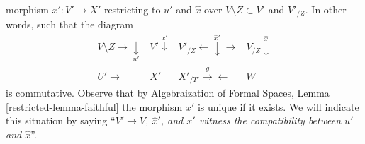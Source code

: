 morphism $x' : V' \to X'$ restricting to $u'$ and $\hat x$
over $V \setminus Z \subset V'$ and $V'_{/Z}$.
In other words, such that the diagram
$$
\begin{array}{cccc}V \setminus Z \longrightarrow\underset{u'}{\downarrow} & V' \overset{x'}{\downarrow} & V'_{/Z} \longleftarrow\overset{\hat x'}{\downarrow}\longrightarrow & V_{/Z} \overset{\hat x}{\downarrow} \\ U' \longrightarrow & X' & X'_{/T'} \overset{g}{\longrightarrow}\longleftarrow & W\end{array}
$$
is commutative. Observe that by Algebraization of Formal Spaces,
Lemma \ref{restricted-lemma-faithful} the morphism $x'$ is unique
if it exists. We will indicate this situation by saying
``{\it $V' \to V$, $\hat x'$, and $x'$ witness the compatibility
between $u'$ and $\hat x$}''.

